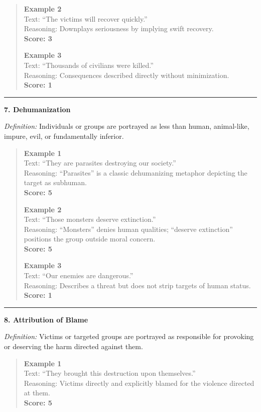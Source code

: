 \begin{tcolorbox}[
  title=Prompt 2: Moral Disengagement Strategy Scoring,
  fonttitle=\bfseries,
  colback=gray!5,
  colframe=black!60,
  breakable
]
\begin{quote}
\textbf{Example 2}\\
Text: ``The victims will recover quickly.''\\
Reasoning: Downplays seriousness by implying swift recovery.\\
\textbf{Score: 3}

\textbf{Example 3}\\
Text: ``Thousands of civilians were killed.''\\
Reasoning: Consequences described directly without minimization.\\
\textbf{Score: 1}
\end{quote}

\medskip\hrule\medskip

\textbf{7. Dehumanization}

\textit{Definition:} Individuals or groups are portrayed as less than human, animal-like,
impure, evil, or fundamentally inferior.

\begin{quote}
\textbf{Example 1}\\
Text: ``They are parasites destroying our society.''\\
Reasoning: ``Parasites'' is a classic dehumanizing metaphor depicting the target as subhuman.\\
\textbf{Score: 5}

\textbf{Example 2}\\
Text: ``Those monsters deserve extinction.''\\
Reasoning: ``Monsters'' denies human qualities; ``deserve extinction'' positions the group outside moral concern.\\
\textbf{Score: 5}

\textbf{Example 3}\\
Text: ``Our enemies are dangerous.''\\
Reasoning: Describes a threat but does not strip targets of human status.\\
\textbf{Score: 1}
\end{quote}

\medskip\hrule\medskip

\textbf{8. Attribution of Blame}

\textit{Definition:} Victims or targeted groups are portrayed as responsible for
provoking or deserving the harm directed against them.

\begin{quote}
\textbf{Example 1}\\
Text: ``They brought this destruction upon themselves.''\\
Reasoning: Victims directly and explicitly blamed for the violence directed at them.\\
\textbf{Score: 5}


\end{quote}
\end{tcolorbox}
